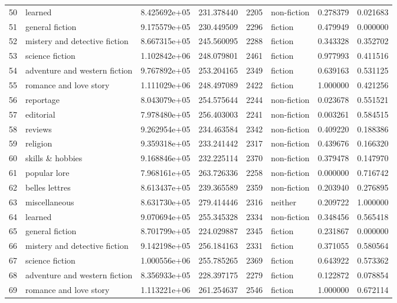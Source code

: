 \documentclass[12pt,letterpaper,twoside]{article}
\begin{document}
\begin{landscape}
\begin{longtable}{llrrrlrr}
50 &                        learned &  8.425692e+05 &  231.378440 &  2205 &   non-fiction &    0.278379 &     0.021683 \\
51 &                general fiction &  9.175579e+05 &  230.449509 &  2296 &       fiction &    0.479949 &     0.000000 \\
52 &  mistery and detective fiction &  8.667315e+05 &  245.560095 &  2288 &       fiction &    0.343328 &     0.352702 \\
53 &                science fiction &  1.102842e+06 &  248.079801 &  2461 &       fiction &    0.977993 &     0.411516 \\
54 &  adventure and western fiction &  9.767892e+05 &  253.204165 &  2349 &       fiction &    0.639163 &     0.531125 \\
55 &         romance and love story &  1.111029e+06 &  248.497089 &  2422 &       fiction &    1.000000 &     0.421256 \\
56 &                      reportage &  8.043079e+05 &  254.575644 &  2244 &   non-fiction &    0.023678 &     0.551521 \\
57 &                      editorial &  7.978480e+05 &  256.403003 &  2241 &   non-fiction &    0.003261 &     0.584515 \\
58 &                        reviews &  9.262954e+05 &  234.463584 &  2342 &   non-fiction &    0.409220 &     0.188386 \\
59 &                       religion &  9.359318e+05 &  233.241442 &  2317 &   non-fiction &    0.439676 &     0.166320 \\
60 &               skills \& hobbies &  9.168846e+05 &  232.225114 &  2370 &   non-fiction &    0.379478 &     0.147970 \\
61 &                   popular lore &  7.968161e+05 &  263.726336 &  2258 &   non-fiction &    0.000000 &     0.716742 \\
62 &                 belles lettres &  8.613437e+05 &  239.365589 &  2359 &   non-fiction &    0.203940 &     0.276895 \\
63 &                  miscellaneous &  8.631730e+05 &  279.414446 &  2316 &       neither &    0.209722 &     1.000000 \\
64 &                        learned &  9.070694e+05 &  255.345328 &  2334 &   non-fiction &    0.348456 &     0.565418 \\
65 &                general fiction &  8.701799e+05 &  224.029887 &  2345 &       fiction &    0.231867 &     0.000000 \\
66 &  mistery and detective fiction &  9.142198e+05 &  256.184163 &  2331 &       fiction &    0.371055 &     0.580564 \\
67 &                science fiction &  1.000556e+06 &  255.785265 &  2369 &       fiction &    0.643922 &     0.573362 \\
68 &  adventure and western fiction &  8.356933e+05 &  228.397175 &  2279 &       fiction &    0.122872 &     0.078854 \\
69 &         romance and love story &  1.113221e+06 &  261.254637 &  2546 &       fiction &    1.000000 &     0.672114 \\
\end{longtable}
\end{landscape}
\end{document}
